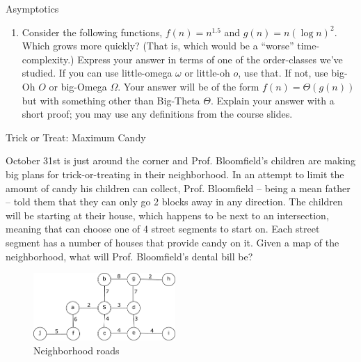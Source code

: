 \documentclass[10pt]{article}
\begin{document}
\thispagestyle{empty}
\handout


\begin{problem} Asymptotics \end{problem}
\begin{enumerate}
\item Consider the following functions, $f(n)=n^{1.5}$ and $g(n)=n (\log n)^2$. Which grows more quickly?  (That is, which would be a ``worse'' time-complexity.)  Express your answer in terms of one of the order-classes we've studied. If you can use little-omega $\omega$ or little-oh $o$, use that. If not, use big-Oh $O$ or big-Omega $\Omega$. Your answer will be of the form $f(n) = \Theta(g(n))$ but with something other than Big-Theta $\Theta$.  Explain your answer with a short proof; you may use any definitions from the course slides.
\end{enumerate}

\solution{
}


\begin{problem} Trick or Treat: Maximum Candy \end{problem}

October 31st is just around the corner and Prof. Bloomfield's children are making big plans for trick-or-treating in their neighborhood. In an attempt to limit the amount of candy his children can collect, Prof. Bloomfield -- being a mean father -- told them that they can only go 2 blocks away in any direction.  The children will be starting at their house, which happens to be next to an intersection, meaning that can choose one of 4 street segments to start on.  Each street segment has a number of houses that provide candy on it.  Given a map of the neighborhood, what will Prof. Bloomfield's dental bill be?



\begin{figure}
  \begin{center}
    \includegraphics[width=0.48\textwidth]{halloween-graph.pdf}
  \end{center}
  \caption{Neighborhood roads}
\end{figure}
\end{document}
